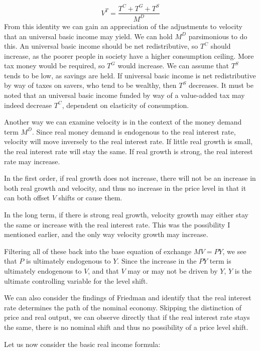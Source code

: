 \documentclass[paper=a4, fontsize=11pt,twoside]{scrartcl}
\begin{document}
\begin{equation}
V^T = \frac{T^C + T^G + T^S}{M^D}
\end{equation}
From this identity we can gain an appreciation of the adjustments to velocity that an universal basic income may yield. We can hold $M^D$ parsimonious to do this. An universal basic income should be net redistributive, so $T^C$ should increase, as the poorer people in society have a higher consumption ceiling. More tax money would be required, so $T^G$ would increase. We can assume that $T^S$ tends to be low, as savings are held. If universal basic income is net redistributive by way of taxes on savers, who tend to be wealthy, then $T^S$ decreases. It must be noted that an universal basic income funded by way of a value-added tax may indeed decrease $T^C$, dependent on elasticity of consumption. 

Another way we can examine velocity is in the context of the money demand term $M^D$. Since real money demand is endogenous to the real interest rate\autocite{wash1}, velocity will move inversely to the real interest rate. If little real growth is small, the real interest rate will stay the same. If real growth is strong, the real interest rate may increase. 

In the first order, if real growth does not increase, there will not be an increase in both real growth and velocity, and thus no increase in the price level in that it can both offset $V$ shifts or cause them. 

In the long term, if there is strong real growth, velocity growth may either stay the same or increase with the real interest rate. This was the possibility I mentioned earlier, and the only way velocity growth may increase.

Filtering all of these back into the base equation of exchange $MV = PY$, we see that $P$ is ultimately endogenous to $Y$. Since the increase in the $PY$ term is ultimately endogenous to $V$, and that $V$ may or may not be driven by $Y$, $Y$ is the ultimate controlling variable for the level shift. 

We can also consider the findings of Friedman\autocite{10.2307/1832113} and identify that the real interest rate determines the path of the nominal economy. Skipping the distinction of price and real output, we can observe directly that if the real interest rate stays the same, there is no nominal shift and thus no possibility of a price level shift.

Let us now consider the basic real income formula:
\end{document}
